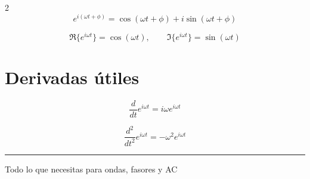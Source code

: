 \documentclass[10pt,a4paper]{article}
\begin{document}
\begin{multicols}{2}
\[
e^{i(\omega t+\phi)}=
\cos(\omega t+\phi)+i\sin(\omega t+\phi)
\]

\[
\Re\{e^{i\omega t}\}=\cos(\omega t), \qquad
\Im\{e^{i\omega t}\}=\sin(\omega t)
\]

\section*{Derivadas útiles}

\[
\frac{d}{dt}e^{i\omega t}=i\omega e^{i\omega t}
\]

\[
\frac{d^2}{dt^2}e^{i\omega t}=-\omega^2 e^{i\omega t}
\]

\end{multicols}

\vspace{0.2cm}
\hrule

\begin{center}
{\small Todo lo que necesitas para ondas, fasores y AC}
\end{center}
\end{document}
